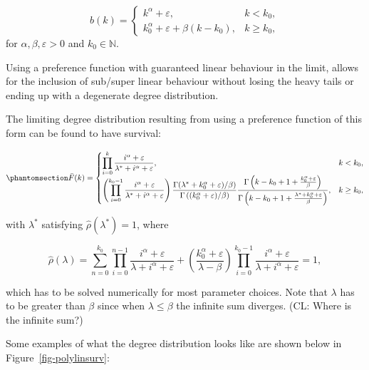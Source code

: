 \documentclass[
  sn-basic,
]{sn-jnl}
\theoremstyle{plain}
\theoremstyle{remark}
\begin{document}
\[
b(k) = \begin{cases}
k^\alpha + \varepsilon,&k<k_0,\\
k_0^\alpha + \varepsilon + \beta(k-k_0), &k\ge k_0,
\end{cases}
\] for \(\alpha,\beta, \varepsilon>0\) and \(k_0\in\mathbb N\).

Using a preference function with guaranteed linear behaviour in the
limit, allows for the inclusion of sub/super linear behaviour without
losing the heavy tails or ending up with a degenerate degree
distribution.

The limiting degree distribution resulting from using a preference
function of this form can be found to have survival:

\begin{equation}\phantomsection\label{eq-polysurv}{
\bar F(k) = \begin{cases}
\displaystyle\prod_{i=0}^{k}\frac{i^\alpha + \varepsilon}{\lambda^*+i^\alpha + \varepsilon},&k<k_0,\\
\displaystyle\left(\prod_{i=0}^{k_0-1}\frac{i^\alpha + \varepsilon}{\lambda^*+i^\alpha + \varepsilon}\right)\frac{\Gamma(\lambda^*+k_0^\alpha + \varepsilon)/\beta)}{\Gamma\left((k_0^\alpha + \varepsilon)/\beta\right)} \frac{\Gamma\left(k-k_0 + 1 +\frac{k_0^\alpha + \varepsilon}{\beta}\right)}{\Gamma\left(k-k_0 + 1 +\frac{\lambda^* +k_0^\alpha + \varepsilon}{\beta}\right)},&k\ge k_0,
\end{cases}
}\end{equation}

with \(\lambda^*\) satisfying \(\hat{\rho}(\lambda^{*})=1\), where

\[
\hat\rho(\lambda) = \sum_{n=0}^{k_0}\prod_{i=0}^{n-1}\frac{i^\alpha + \varepsilon}{\lambda+i^\alpha + \varepsilon} + \left(\frac{k_0^\alpha + \varepsilon}{\lambda-\beta}\right)\prod_{i=0}^{k_0-1}\frac{i^\alpha + \varepsilon}{\lambda + i^\alpha + \varepsilon} = 1,
\]

which has to be solved numerically for most parameter choices. Note that
\(\lambda\) has to be greater than \(\beta\) since when
\(\lambda\le \beta\) the infinite sum diverges. (CL: Where is the
infinite sum?)

Some examples of what the degree distribution looks like are shown below
in Figure~\ref{fig-polylinsurv}:
\end{document}
